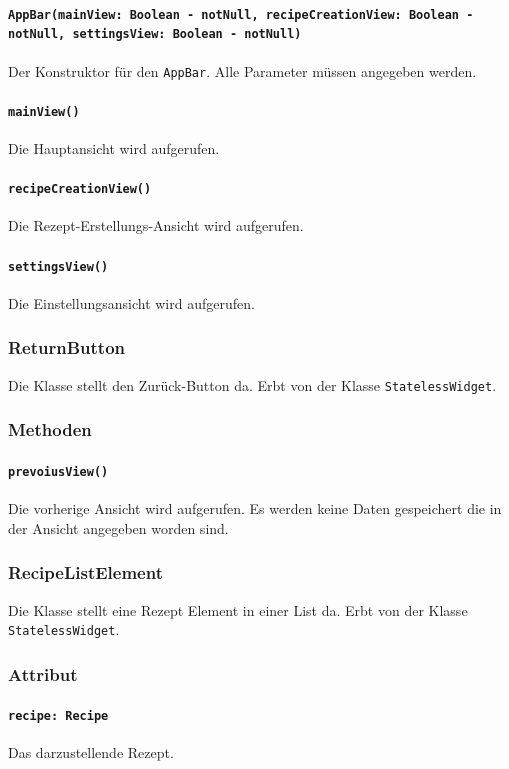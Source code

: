 \documentclass{entwurfsheft}
\begin{document}
            \paragraph*{\texttt{AppBar(mainView: Boolean - notNull, recipeCreationView: Boolean - notNull, settingsView: Boolean - notNull)}} Der Konstruktor für den \texttt{AppBar}. Alle Parameter müssen angegeben werden. 
            \paragraph*{\texttt{mainView()}} Die Hauptansicht wird aufgerufen.
            \paragraph*{\texttt{recipeCreationView()}} Die Rezept-Erstellungs-Ansicht wird aufgerufen.
            \paragraph*{\texttt{settingsView()}} Die Einstellungsansicht wird aufgerufen.

    \subsubsection{ReturnButton} \label{sec:ReturnButton}
        Die Klasse stellt den Zurück-Button da. Erbt von der Klasse \texttt{StatelessWidget}.
        \subsubsection*{Methoden}
            \paragraph*{\texttt{prevoiusView()}} Die vorherige Ansicht wird aufgerufen. Es werden keine Daten gespeichert die in der Ansicht angegeben worden sind.
    
    \subsubsection{RecipeListElement} \label{sec:RecipeListElement}
        Die Klasse stellt eine Rezept Element in einer List da. Erbt von der Klasse \texttt{StatelessWidget}.
        \subsubsection*{Attribut}
            \paragraph*{\texttt{recipe: Recipe}} Das darzustellende Rezept.
\end{document}
